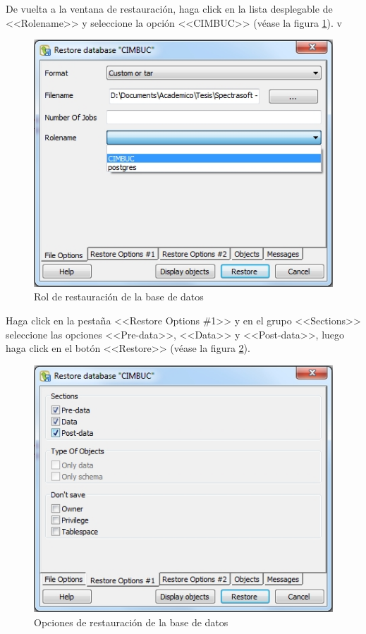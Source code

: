 De vuelta a la ventana de restauraci\'{o}n, haga click en la lista desplegable de <<Rolename>> y seleccione la opci\'{o}n <<CIMBUC>> (v\'{e}ase la figura \ref{fig:pgadmin-restaurar-rol}).
v
\begin{figure}[H]
  \centering
  \includegraphics[width=.6\linewidth]{./img/pgadmin-restaurar-rol.jpg}
\caption[]{Rol de restauraci\'{o}n de la base de datos\label{fig:pgadmin-restaurar-rol}}
\end{figure}
\vfill
Haga click en la pesta\~{n}a <<Restore Options \#1>> y en el grupo <<Sections>> seleccione las opciones <<Pre-data>>, <<Data>> y <<Post-data>>, luego haga click en el bot\'{o}n <<Restore>> (v\'{e}ase la figura \ref{fig:pgadmin-restaurar-opciones}).
\vfill
\begin{figure}[H]
  \centering
  \includegraphics[width=.6\linewidth]{./img/pgadmin-restaurar-opciones.jpg}
\caption[]{Opciones de restauraci\'{o}n de la base de datos\label{fig:pgadmin-restaurar-opciones}}
\end{figure}
\vfill
\newpage

